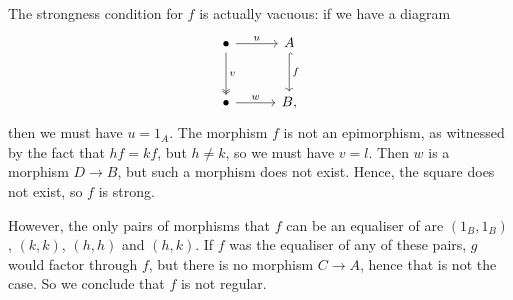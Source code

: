 The strongness condition for $f$ is actually vacuous: if we have a diagram
\[\begin{tikzcd}[row sep=1cm, column sep=1cm]
	\bullet\ar[r, "u"]\ar[d, two heads, "v"] & A\ar[d, hook, "f"]\\
	\bullet\ar[r, "w"] & B,
\end{tikzcd}\]
then we must have $u = 1_A$. The morphism  $f$ is not an epimorphism, as witnessed
by the fact that $hf = kf$, but $h\neq k$, so we must have $v = l$. Then $w$ is
a morphism $D \to B$, but such a morphism does not exist. Hence, the square does not
exist, so $f$ is strong.

However, the only pairs of morphisms that $f$ can be an equaliser of are
$(1_B, 1_B)$, $(k, k)$, $(h, h)$ and $(h, k)$. If $f$ was the equaliser of any
of these pairs, $g$ would factor through $f$, but there is no morphism $C\to A$,
hence that is not the case. So we conclude that $f$ is not regular.
